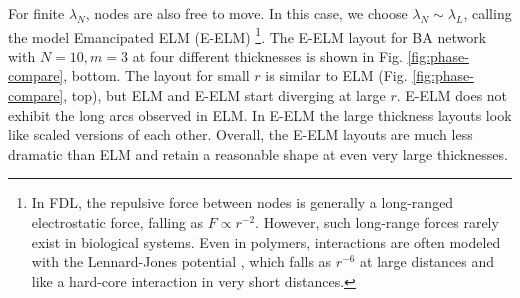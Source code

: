 \documentclass[nofootinbib,preprint,floatfix,endfloats]{revtex4} %
\begin{document}
For finite $\lambda_N$, nodes are also free to move. In this case, we choose 
$\lambda_N \sim \lambda_L$, calling the model Emancipated ELM (E-ELM) 
\footnote{In FDL, the repulsive force between nodes is generally a long-ranged electrostatic force, falling as $F \propto r^{-2}$. 
However, such long-range forces rarely exist in biological systems. Even in polymers, interactions are often modeled with the Lennard-Jones potential \cite{lennard1924determination}, which falls as $r^{-6}$ at large distances and like a hard-core interaction in very short distances. }.
The E-ELM layout for BA network with $N=10, m=3$ at four different thicknesses is shown in  
Fig. \ref{fig:phase-compare}, bottom. The layout for small $r$ is similar to ELM (Fig. \ref{fig:phase-compare}, top), but ELM and E-ELM start diverging at large $r$. E-ELM does not exhibit the long arcs observed in ELM. In E-ELM the large thickness layouts look like scaled versions of each other. Overall, the E-ELM layouts are much less dramatic than ELM and retain a reasonable shape at even very large thicknesses.
%
\end{document}
